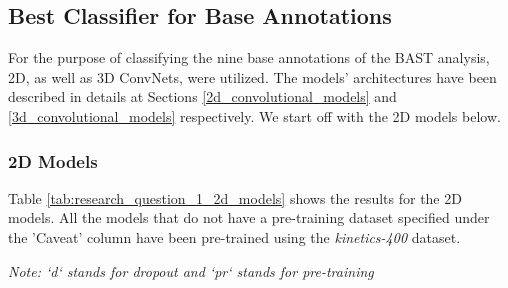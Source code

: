 \documentclass[extern,palatino]{cgMA}
\begin{document}
\subsection{Best Classifier for Base Annotations}
\label{research_question_1}


\bigskip \bigskip
\noindent For the purpose of classifying the nine base annotations of the BAST analysis, 2D, as well as 3D ConvNets, were utilized. The models' architectures have been described in details at Sections \ref{2d_convolutional_models} and \ref{3d_convolutional_models} respectively. We start off with the 2D models below.

\subsubsection{2D Models}
Table \ref{tab:research_question_1_2d_models} shows the results for the 2D models. All the models that do not have a pre-training dataset specified under the 'Caveat' column have been pre-trained using the \textit{kinetics-400} dataset.

\bigskip
\noindent\textit{Note: `d` stands for dropout and `pr` stands for pre-training}
\end{document}
